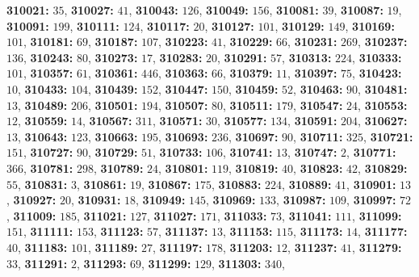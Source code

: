 \textsf{\bfseries 310021:} $35$, \textsf{\bfseries 310027:} $41$, \textsf{\bfseries 310043:} $126$, \textsf{\bfseries 310049:} $156$, \textsf{\bfseries 310081:} $39$, \textsf{\bfseries 310087:} $19$, \textsf{\bfseries 310091:} $199$, \textsf{\bfseries 310111:} $124$, \textsf{\bfseries 310117:} $20$, \textsf{\bfseries 310127:} $101$, \textsf{\bfseries 310129:} $149$, \textsf{\bfseries 310169:} $101$, \textsf{\bfseries 310181:} $69$, \textsf{\bfseries 310187:} $107$, \textsf{\bfseries 310223:} $41$, \textsf{\bfseries 310229:} $66$, \textsf{\bfseries 310231:} $269$, \textsf{\bfseries 310237:} $136$, \textsf{\bfseries 310243:} $80$, \textsf{\bfseries 310273:} $17$, \textsf{\bfseries 310283:} $20$, \textsf{\bfseries 310291:} $57$, \textsf{\bfseries 310313:} $224$, \textsf{\bfseries 310333:} $101$, \textsf{\bfseries 310357:} $61$, \textsf{\bfseries 310361:} $446$, \textsf{\bfseries 310363:} $66$, \textsf{\bfseries 310379:} $11$, \textsf{\bfseries 310397:} $75$, \textsf{\bfseries 310423:} $10$, \textsf{\bfseries 310433:} $104$, \textsf{\bfseries 310439:} $152$, \textsf{\bfseries 310447:} $150$, \textsf{\bfseries 310459:} $52$, \textsf{\bfseries 310463:} $90$, \textsf{\bfseries 310481:} $13$, \textsf{\bfseries 310489:} $206$, \textsf{\bfseries 310501:} $194$, \textsf{\bfseries 310507:} $80$, \textsf{\bfseries 310511:} $179$, \textsf{\bfseries 310547:} $24$, \textsf{\bfseries 310553:} $12$, \textsf{\bfseries 310559:} $14$, \textsf{\bfseries 310567:} $311$, \textsf{\bfseries 310571:} $30$, \textsf{\bfseries 310577:} $134$, \textsf{\bfseries 310591:} $204$, \textsf{\bfseries 310627:} $13$, \textsf{\bfseries 310643:} $123$, \textsf{\bfseries 310663:} $195$, \textsf{\bfseries 310693:} $236$, \textsf{\bfseries 310697:} $90$, \textsf{\bfseries 310711:} $325$, \textsf{\bfseries 310721:} $151$, \textsf{\bfseries 310727:} $90$, \textsf{\bfseries 310729:} $51$, \textsf{\bfseries 310733:} $106$, \textsf{\bfseries 310741:} $13$, \textsf{\bfseries 310747:} $2$, \textsf{\bfseries 310771:} $366$, \textsf{\bfseries 310781:} $298$, \textsf{\bfseries 310789:} $24$, \textsf{\bfseries 310801:} $119$, \textsf{\bfseries 310819:} $40$, \textsf{\bfseries 310823:} $42$, \textsf{\bfseries 310829:} $55$, \textsf{\bfseries 310831:} $3$, \textsf{\bfseries 310861:} $19$, \textsf{\bfseries 310867:} $175$, \textsf{\bfseries 310883:} $224$, \textsf{\bfseries 310889:} $41$, \textsf{\bfseries 310901:} $13$, \textsf{\bfseries 310927:} $20$, \textsf{\bfseries 310931:} $18$, \textsf{\bfseries 310949:} $145$, \textsf{\bfseries 310969:} $133$, \textsf{\bfseries 310987:} $109$, \textsf{\bfseries 310997:} $72$, \textsf{\bfseries 311009:} $185$, \textsf{\bfseries 311021:} $127$, \textsf{\bfseries 311027:} $171$, \textsf{\bfseries 311033:} $73$, \textsf{\bfseries 311041:} $111$, \textsf{\bfseries 311099:} $151$, \textsf{\bfseries 311111:} $153$, \textsf{\bfseries 311123:} $57$, \textsf{\bfseries 311137:} $13$, \textsf{\bfseries 311153:} $115$, \textsf{\bfseries 311173:} $14$, \textsf{\bfseries 311177:} $40$, \textsf{\bfseries 311183:} $101$, \textsf{\bfseries 311189:} $27$, \textsf{\bfseries 311197:} $178$, \textsf{\bfseries 311203:} $12$, \textsf{\bfseries 311237:} $41$, \textsf{\bfseries 311279:} $33$, \textsf{\bfseries 311291:} $2$, \textsf{\bfseries 311293:} $69$, \textsf{\bfseries 311299:} $129$, \textsf{\bfseries 311303:} $340$, 
